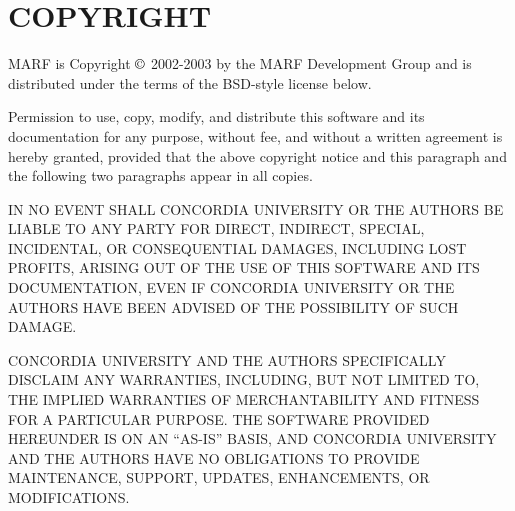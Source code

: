 \section{COPYRIGHT}

MARF is Copyright $\copyright$ 2002-2003
by the MARF Development Group and is distributed under
the terms of the BSD-style license below.

\noindent
Permission to use, copy, modify, and distribute this software and
its documentation for any purpose, without fee, and without a
written agreement is hereby granted, provided that the above
copyright notice and this paragraph and the following two paragraphs
appear in all copies.

\noindent
IN NO EVENT SHALL CONCORDIA UNIVERSITY OR THE AUTHORS BE LIABLE TO ANY
PARTY FOR DIRECT, INDIRECT, SPECIAL, INCIDENTAL, OR CONSEQUENTIAL
DAMAGES, INCLUDING LOST PROFITS, ARISING OUT OF THE USE OF THIS
SOFTWARE AND ITS DOCUMENTATION, EVEN IF CONCORDIA UNIVERSITY OR THE AUTHORS
HAVE BEEN ADVISED OF THE POSSIBILITY OF SUCH DAMAGE.

\noindent
CONCORDIA UNIVERSITY AND THE AUTHORS SPECIFICALLY DISCLAIM ANY WARRANTIES,
INCLUDING, BUT NOT LIMITED TO, THE IMPLIED WARRANTIES OF
MERCHANTABILITY AND FITNESS FOR A PARTICULAR PURPOSE.  THE SOFTWARE
PROVIDED HEREUNDER IS ON AN ``AS-IS'' BASIS, AND CONCORDIA UNIVERSITY AND THE
AUTHORS HAVE NO OBLIGATIONS TO PROVIDE MAINTENANCE, SUPPORT,
UPDATES, ENHANCEMENTS, OR MODIFICATIONS.

